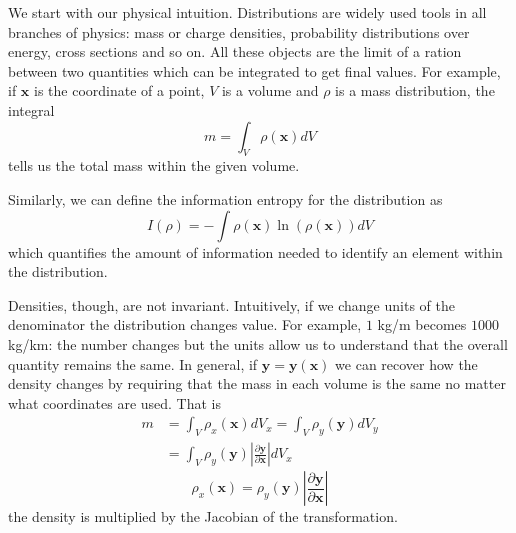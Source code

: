 \documentclass[smallextended]{svjour3}
\numberwithin{equation}{section}
\theoremstyle{definition}
\begin{document}
We start with our physical intuition. Distributions are widely used tools in all branches of physics: mass or charge densities, probability distributions over energy, cross sections and so on. All these objects are the limit of a ration between two quantities which can be integrated to get final values. For example, if $\mathbf{x}$ is the coordinate of a point, $V$ is a volume and $\rho$ is a mass distribution, the integral
\begin{equation}
m =\int_V \rho(\mathbf{x}) dV
\end{equation}
tells us the total mass within the given volume.

Similarly, we can define the information entropy for the distribution as
\begin{equation}
I(\rho) =-\int \rho(\mathbf{x}) \ln (\rho(\mathbf{x})) dV
\end{equation}
which quantifies the amount of information needed to identify an element within the distribution.

Densities, though, are not invariant. Intuitively, if we change units of the denominator the distribution changes value. For example, $1$ kg/m becomes $1000$ kg/km: the number changes but the units allow us to understand that the overall quantity remains the same. In general, if $\mathbf{y}=\mathbf{y}(\mathbf{x})$ we can recover how the density changes by requiring that the mass in each volume is the same no matter what coordinates are used. That is
\begin{align*}
m &=\int_V \rho_x(\mathbf{x}) dV_x = \int_V \rho_y(\mathbf{y}) dV_y \\
&=\int_V\rho_y(\mathbf{y}) \left|\frac{\partial \mathbf{y}}{\partial \mathbf{x}}\right| dV_x
\end{align*}
\begin{equation}
\rho_x(\mathbf{x}) = \rho_y(\mathbf{y}) \left|\frac{\partial \mathbf{y}}{\partial \mathbf{x}}\right|
\end{equation}
the density is multiplied by the Jacobian of the transformation.
\end{document}
